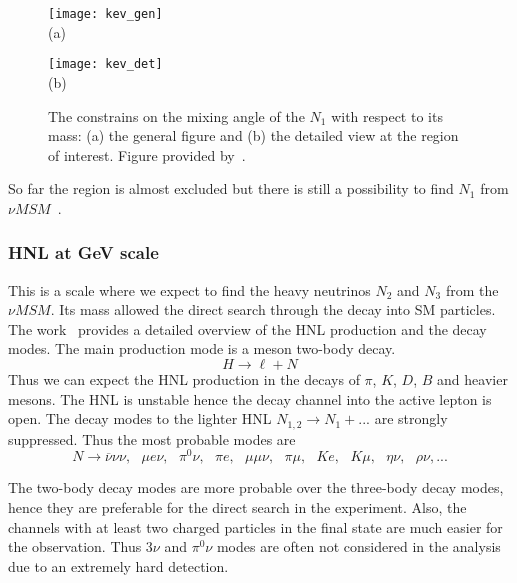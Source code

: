 \documentclass[../main.tex]{subfiles}
\begin{document}
\begin{figure}[!ht]
  \centering
  \begin{minipage}{0.49\linewidth}
    \centering
    \texttt{[image: kev\_gen]} \\ (a)
  \end{minipage}
  \begin{minipage}{0.49\linewidth}
    \centering
    \texttt{[image: kev\_det]} \\ (b)
  \end{minipage}
  \caption{The constrains on the mixing angle of the $N_1$ with respect to its mass: (a) the general figure and (b) the detailed view at the region of interest. Figure provided by~\cite{Perez2017}.}
  \label{fig:intro:hnl_kev}
\end{figure}

So far the region is almost excluded but there is still a possibility to find $N_1$ from $\nu MSM$~\cite{Caputo2020}.

\subsubsection{HNL at GeV scale}
This is a scale where we expect to find the heavy neutrinos $N_2$ and $N_3$ from the $\nu MSM$. Its mass allowed the direct search through the decay into SM particles. The work~\cite{Gorbunov2007} provides a detailed overview of the HNL production and the decay modes. The main production mode is a meson two-body decay.
\begin{equation}
H\to\ell+N
\end{equation}
Thus we can expect the HNL production in the decays of $\pi$, $K$, $D$, $B$ and heavier mesons. The HNL is unstable hence the decay channel into the active lepton is open. The decay modes to the lighter HNL $N_{1,2}\to N_1+...$ are strongly suppressed. Thus the most probable modes are
\begin{equation}
N\to\overline{\nu}\nu\nu,\text{   } \mu e\nu, \text{   }\pi^0\nu, \text{   }\pi e, \text{   }\mu\mu\nu, \text{   }\pi\mu, \text{   }Ke,\text{   } K\mu,\text{   } \eta\nu, \text{   }\rho\nu,...
\end{equation}

The two-body decay modes are more probable over the three-body decay modes, hence they are preferable for the direct search in the experiment. Also, the channels with at least two charged particles in the final state are much easier for the observation. Thus $3\nu$ and $\pi^0\nu$ modes are often not considered in the analysis due to an extremely hard detection.
\end{document}

